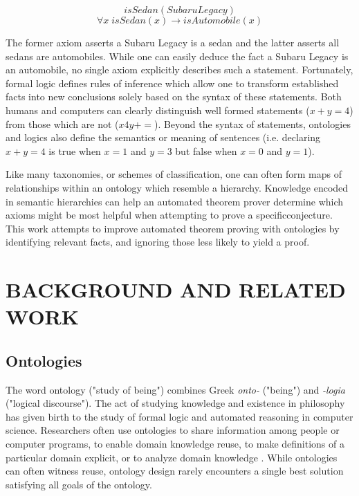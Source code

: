\documentclass{article}
\begin{document}
\begin{singlespace}
\[isSedan(Subaru Legacy)\]
\[\forall x \; isSedan(x) \rightarrow isAutomobile(x)\]
\end{singlespace}

The former axiom asserts a Subaru Legacy is a sedan and the latter asserts all sedans are automobiles. While one can easily deduce the fact a Subaru Legacy is an automobile, no single axiom explicitly describes such a statement. Fortunately, formal logic defines rules of inference which allow one to transform established facts into new conclusions solely based on the syntax of these statements. Both humans and computers can clearly distinguish well formed statements ($x+y=4$) from those which are not ($x4y+=$). Beyond the syntax of statements, ontologies and logics also define the semantics or meaning of sentences (i.e. declaring $x+y=4$ is true when $x=1$ and $y=3$ but false when $x=0$ and $y=1$). 

Like many taxonomies, or schemes of classification, one can often form maps of relationships within an ontology which resemble a hierarchy. Knowledge encoded in semantic hierarchies can help an automated theorem prover determine which axioms might be most helpful when attempting to prove a specificconjecture. This work attempts to improve automated theorem proving with ontologies by identifying relevant facts, and ignoring those less likely to yield a proof. 

\newpage
\vspace*{.05in}
\section{\MakeUppercase{Background and Related Work}}


\subsection{{Ontologies}}

 The word ontology ("study of being") combines Greek \textit{onto-} ("being") and \textit{-logia} ("logical discourse"). The act of studying knowledge and existence in philosophy has given birth to the study of formal logic and automated reasoning in computer science. Researchers often use ontologies to share information among people or computer programs, to enable domain knowledge reuse, to make definitions of a particular domain explicit, or to analyze domain knowledge \cite{noy2001ontology}. While ontologies can often witness reuse, ontology design rarely encounters a single best solution satisfying all goals of the ontology. 
 
\end{document}
